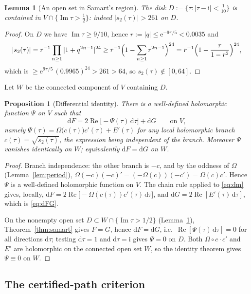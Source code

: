 \documentclass[11pt]{article}
\newtheorem{lemma}[theorem]{Lemma}
\newtheorem{proposition}[theorem]{Proposition}
\theoremstyle{definition}
\theoremstyle{remark}
\newcommand{\ii}{\mathrm{i}}
\newcommand{\e}{\mathrm{e}}
\newcommand{\id}{\mathrm{d}}
\newcommand{\ImT}{\operatorname{Im}}
\newcommand{\ReT}{\operatorname{Re}}
\begin{document}
\begin{lemma}[An open set in Samart's region]\label{lem:disk}
The disk $D:=\{\tau:|\tau-\ii|<\tfrac1{10}\}$ is contained in
$V\cap\{\ImT\tau>\tfrac12\}$: indeed $|s_2(\tau)|>261$ on $D$.
\end{lemma}
\begin{proof}
On $D$ we have $\ImT\tau\ge9/10$, hence $r:=|q|\le\e^{-9\pi/5}<0.0035$ and
\[
  |s_2(\tau)|
  =r^{-1}\prod_{n\ge1}|1+q^{2n-1}|^{24}
  \ge r^{-1}\Bigl(1-\sum_{n\ge1}r^{2n-1}\Bigr)^{24}
  =r^{-1}\Bigl(1-\frac{r}{1-r^2}\Bigr)^{24},
\]
which is $\ge \e^{9\pi/5}\,(0.9965)^{24}>261>64$,
so $s_2(\tau)\notin[0,64]$.
\end{proof}

Let $W$ be the connected component of $V$ containing $D$.

\begin{proposition}[Differential identity]\label{prop:diffid}
There is a well-defined holomorphic function $\Psi$ on $V$ such that
\begin{equation}\label{eq:dFG}
  \id F=2\ReT\bigl[-\Psi(\tau)\,\id\tau\bigr]+\id G
  \qquad\text{on }V,
\end{equation}
namely $\Psi(\tau)=\Omega\bigl(c(\tau)\bigr)c'(\tau)+E'(\tau)$ for any
local holomorphic branch $c(\tau)=\sqrt{s_2(\tau)}$, the expression being
independent of the branch. Moreover $\Psi$ vanishes identically on $W$;
equivalently $\id F=\id G$ on $W$.
\end{proposition}
\begin{proof}
Branch independence: the other branch is $-c$, and by the oddness of
$\Omega$ (Lemma~\ref{lem:period}),
$\Omega(-c)(-c)'=(-\Omega(c))(-c')=\Omega(c)c'$. Hence $\Psi$ is a
well-defined holomorphic function on $V$. The chain rule applied to
\eqref{eq:dm} gives, locally,
$\id F=2\ReT\bigl[-\Omega(c(\tau))c'(\tau)\,\id\tau\bigr]$, and
$\id G=2\ReT[E'(\tau)\,\id\tau]$, which is \eqref{eq:dFG}.

On the nonempty open set $D\subset W\cap\{\ImT\tau>1/2\}$
(Lemma~\ref{lem:disk}), Theorem~\ref{thm:samart} gives $F=G$, hence
$\id F=\id G$, i.e.\ $\ReT[\Psi(\tau)\,\id\tau]=0$ for all directions
$\id\tau$; testing $\id\tau=1$ and $\id\tau=\ii$ gives $\Psi=0$ on $D$.
Both $\Omega\circ c\cdot c'$ and $E'$ are holomorphic on the connected
open set $W$, so the identity theorem gives $\Psi\equiv0$ on $W$.
\end{proof}

\subsection{The certified-path criterion}\label{subsec:criterion}
\end{document}
